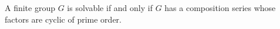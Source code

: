 A finite group $G$ is solvable if and only if $G$ has a composition series whose factors are cyclic of prime order.
